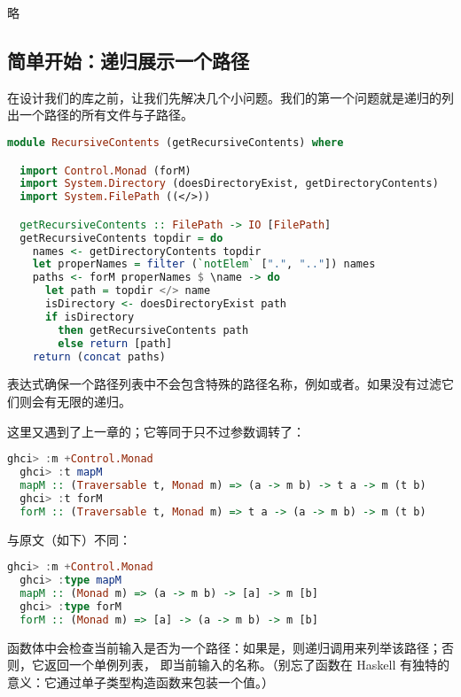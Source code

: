 \documentclass[./main.tex]{subfiles}
\begin{document}
略

\subsection*{简单开始：递归展示一个路径}

在设计我们的库之前，让我们先解决几个小问题。我们的第一个问题就是递归的列出一个路径的所有文件与子路径。

\begin{lstlisting}[language=Haskell]
  module RecursiveContents (getRecursiveContents) where

  import Control.Monad (forM)
  import System.Directory (doesDirectoryExist, getDirectoryContents)
  import System.FilePath ((</>))

  getRecursiveContents :: FilePath -> IO [FilePath]
  getRecursiveContents topdir = do
    names <- getDirectoryContents topdir
    let properNames = filter (`notElem` [".", ".."]) names
    paths <- forM properNames $ \name -> do
      let path = topdir </> name
      isDirectory <- doesDirectoryExist path
      if isDirectory
        then getRecursiveContents path
        else return [path]
    return (concat paths)
\end{lstlisting}

表达式确保一个路径列表中不会包含特殊的路径名称，例如或者。如果没有过滤它们则会有无限的递归。

这里又遇到了上一章的；它等同于只不过参数调转了：

\begin{lstlisting}[language=Haskell]
  ghci> :m +Control.Monad
  ghci> :t mapM
  mapM :: (Traversable t, Monad m) => (a -> m b) -> t a -> m (t b)
  ghci> :t forM
  forM :: (Traversable t, Monad m) => t a -> (a -> m b) -> m (t b)
\end{lstlisting}

与原文（如下）不同：

\begin{lstlisting}[language=Haskell]
  ghci> :m +Control.Monad
  ghci> :type mapM
  mapM :: (Monad m) => (a -> m b) -> [a] -> m [b]
  ghci> :type forM
  forM :: (Monad m) => [a] -> (a -> m b) -> m [b]
\end{lstlisting}

函数体中会检查当前输入是否为一个路径：如果是，则递归调用来列举该路径；否则，它返回一个单例列表，
即当前输入的名称。（别忘了函数在 Haskell 有独特的意义：它通过单子类型构造函数来包装一个值。）
\end{document}
